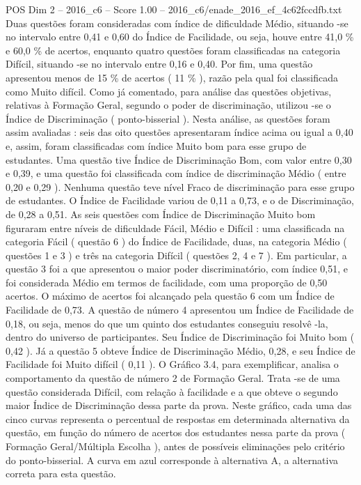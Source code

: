 \begin{textsample}{POS Dim 2 – 2016\_c6 – Score 1.00 – 2016\_c6/enade\_2016\_ef\_4c62fccdfb.txt}
Duas questões foram consideradas com índice de dificuldade Médio, situando -se no intervalo entre 0,41 e 0,60 do Índice de Facilidade, ou seja, houve entre 41,0 \% e 60,0 \% de acertos, enquanto quatro questões foram classificadas na categoria Difícil, situando -se no intervalo entre 0,16 e 0,40.
Por fim, uma questão apresentou menos de 15 \% de acertos ( 11 \% ), razão pela qual foi classificada como Muito difícil.
Como já comentado, para análise das questões objetivas, relativas à Formação Geral, segundo o poder de discriminação, utilizou -se o Índice de Discriminação ( ponto-bisserial ).
Nesta análise, as questões foram assim avaliadas : seis das oito questões apresentaram índice acima ou igual a 0,40 e, assim, foram classificadas com índice Muito bom para esse grupo de estudantes.
Uma questão tive Índice de Discriminação Bom, com valor entre 0,30 e 0,39, e uma questão foi classificada com índice de discriminação Médio ( entre 0,20 e 0,29 ).
Nenhuma questão teve nível Fraco de discriminação para esse grupo de estudantes.
O Índice de Facilidade variou de 0,11 a 0,73, e o de Discriminação, de 0,28 a 0,51.
As seis questões com Índice de Discriminação Muito bom figuraram entre níveis de dificuldade Fácil, Médio e Difícil : uma classificada na categoria Fácil ( questão 6 ) do Índice de Facilidade, duas, na categoria Médio ( questões 1 e 3 ) e três na categoria Difícil ( questões 2, 4 e 7 ).
Em particular, a questão 3 foi a que apresentou o maior poder discriminatório, com índice 0,51, e foi considerada Médio em termos de facilidade, com uma proporção de 0,50 acertos.
O máximo de acertos foi alcançado pela questão 6 com um Índice de Facilidade de 0,73.
A questão de número 4 apresentou um Índice de Facilidade de 0,18, ou seja, menos do que um quinto dos estudantes conseguiu resolvê -la, dentro do universo de participantes.
Seu Índice de Discriminação foi Muito bom ( 0,42 ).
Já a questão 5 obteve Índice de Discriminação Médio, 0,28, e seu Índice de Facilidade foi Muito difícil ( 0,11 ).
O Gráfico 3.4, para exemplificar, analisa o comportamento da questão de número 2 de Formação Geral.
Trata -se de uma questão considerada Difícil, com relação à facilidade e a que obteve o segundo maior Índice de Discriminação dessa parte da prova.
Neste gráfico, cada uma das cinco curvas representa o percentual de respostas em determinada alternativa da questão, em função do número de acertos dos estudantes nessa parte da prova ( Formação Geral/Múltipla Escolha ), antes de possíveis eliminações pelo critério do ponto-bisserial.
A curva em azul corresponde à alternativa A, a alternativa correta para esta questão.

\end{textsample}
